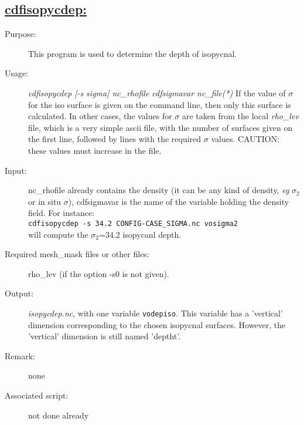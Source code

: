 \documentclass[a4paper,11pt]{article}
\begin{document}
\subsection*{\underline{cdfisopycdep:}}
\begin{description}
\item[Purpose:] This program is used to determine the depth of isopycnal.
\item[Usage:] {\em cdfisopycdep [-s sigma]  nc\_rhofile cdfsigmavar nc\_file(*)  }
If the value of $\sigma$ for the iso surface is given on the command line, then only this surface is calculated. In other cases, the
values for $\sigma$ are taken from the local {\em rho\_lev} file, which is a very simple ascii file, with the number of surfaces given on the
first line, followed by lines with the required $\sigma$ values. CAUTION: these values must increase in the file.
\item[Input:]  nc\_rhofile already contains the density (it can be any kind of density, {\it eg} $\sigma_2$ or in situ $\sigma$), cdfsigmavar is
 the name of the variable holding the density field.
For instance:\\
 {\tt cdfisopycdep -s 34.2 CONFIG-CASE\_SIGMA.nc vosigma2 } \\
will compute the $\sigma_2$=34.2 isopycanl depth.
\item[Required mesh\_mask files or other files:]  rho\_lev (if the option -s0 is not given).
\item[Output:] {\em isopycdep.nc}, with one variable {\tt vodepiso}. This variable has a 'vertical' dimension corresponding to the chosen isopycnal
surfaces. However, the 'vertical' dimension is still named 'deptht'.
\item[Remark:]  none
\item[Associated script:] not done already
\end{description}



\newpage
\end{document}
